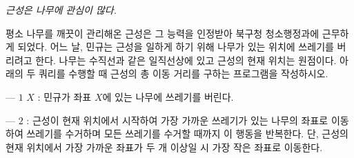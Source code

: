 \it{근성은 나무에 관심이 많다.}

평소 나무를 깨끗이 관리해온 근성은 그 능력을 인정받아 북구청 청소행정과에 근무하게 되었다. 어느 날, 민규는 근성을 일하게 하기 위해 나무가 있는 위치에 쓰레기를 버리려고 한다. 나무는 수직선과 같은 일직선상에 있고 근성의 현재 위치는 원점이다. 아래의 두 쿼리를 수행할 때 근성의 총 이동 거리를 구하는 프로그램을 작성하시오.

--- $1$ $X$ : 민규가 좌표 $X$에 있는 나무에 쓰레기를 버린다.

--- $2$ : 근성이 현재 위치에서 시작하여 가장 가까운 쓰레기가 있는 나무의 좌표로 이동하여 쓰레기를 수거하며 모든 쓰레기를 수거할 때까지 이 행동을 반복한다. 단, 근성의 현재 위치에서 가장 가까운 좌표가 두 개 이상일 시 가장 작은 좌표로 이동한다.
